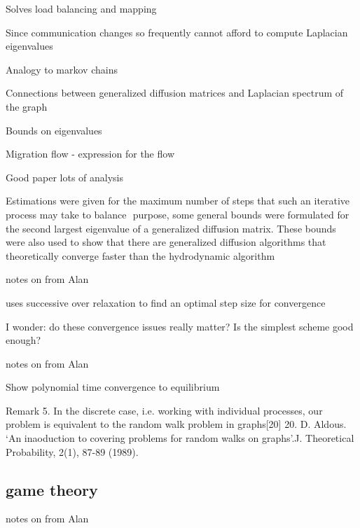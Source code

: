 \documentclass{article}
\begin{document}
Solves load balancing and mapping

Since communication changes so frequently cannot afford to compute Laplacian eigenvalues

Analogy to markov chains

Connections between generalized diffusion matrices and Laplacian spectrum of the graph

Bounds on eigenvalues

Migration flow - expression for the flow

Good paper lots of analysis


Estimations were given for the maximum number of steps that such an iterative process may take to balance
 purpose, some general bounds were formulated for the second largest eigenvalue of a generalized diffusion matrix. These bounds were also used to show that there are generalized diffusion algorithms that theoretically converge faster than the hydrodynamic algorithm 



\medskip

notes on
\cite{10.2307/2584287}
from Alan


uses successive over relaxation to find an optimal step size for convergence

I wonder: do these convergence issues really matter?  Is the simplest scheme good enough?


\medskip

notes on
\cite{Boillat:1990:LBP:95324.95326}
from Alan

Show polynomial time convergence to equilibrium

Remark 5. In the discrete case, i.e. working with individual processes, our problem is equivalent to the random walk problem in graphs[20] 
20. D. Aldous. ‘An inaoduction to covering problems for random walks on graphs’.J. Theoretical 
Probability, 2(1), 87-89 (1989).






\subsection{game theory}

\cite{GROSU20051022}
\cite{doi:10.1142/S0219198902000574}
\cite{7967109}
\cite{BELIKOVETSKY201616}



\medskip

notes on
\cite{GROSU20051022}
from Alan
\end{document}
